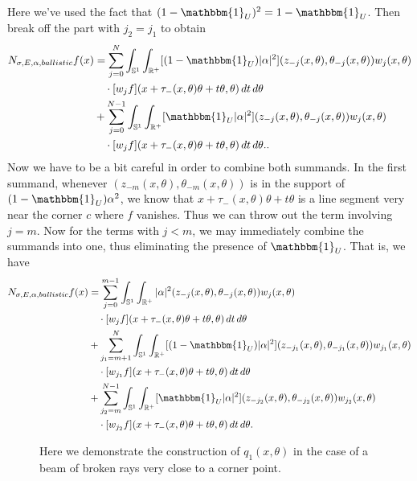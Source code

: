 \documentclass[10pt]{amsart}
\theoremstyle{definition}
\theoremstyle{definition}
\theoremstyle{definition}
\newcommand{ \rn }[1]{\mathbb{R}^{#1}}
\begin{document}
Here we've used the fact that $(1-\mathbbm{1}_{U})^{2} = 1 - \mathbbm{1}_{U}$. Then break off the part with $j_{2} = j_{1}$ to obtain
\begin{align*}
N_{\sigma, E, \alpha, ballistic}f(x) & =  \sum_{j=0}^{N}\int_{\mathbb{S}^{1}}\int_{\rn{+}}[(1-\mathbbm{1}_{U})|\alpha|^{2}](z_{-j}(x,\theta),\theta_{-j}(x,\theta))w_{j}(x,\theta) \notag\\
& \quad \cdot [w_{j}f](x + \tau_{-}(x,\theta)\theta+ t\theta, \theta)\, dt \,d\theta \notag\\
& +  \sum_{j=0}^{N-1}\int_{\mathbb{S}^{1}}\int_{\rn{+}}[\mathbbm{1}_{U}|\alpha|^{2}](z_{-j}(x,\theta),\theta_{-j}(x,\theta))w_{j}(x,\theta) \notag\\
& \quad \cdot [w_{j}f](x + \tau_{-}(x,\theta)\theta + t\theta, \theta)\, dt \,d\theta.\notag.
\end{align*}
Now we have to be a bit careful in order to combine both summands. In the first summand, whenever $(z_{-m}(x,\theta), \theta_{-m}(x,\theta))$ is in the support of $(1-\mathbbm{1}_{U})\alpha^{2}$, we know that $x+\tau_{-}(x,\theta)\theta + t\theta$ is a line segment very near the corner $c$ where $f$ vanishes. Thus we can throw out the term involving $j = m$. Now for the terms with $j < m$, we may immediately combine the summands into one, thus eliminating the presence of $\mathbbm{1}_{U}$. That is, we have
\begin{align}
N_{\sigma, E, \alpha, ballistic}f(x) & = \sum_{j=0}^{m-1}\int_{\mathbb{S}^{1}}\int_{\rn{+}}|\alpha|^{2}(z_{-j}(x,\theta),\theta_{-j}(x,\theta))w_{j}(x,\theta) \notag\\
& \quad \cdot [w_{j}f](x + \tau_{-}(x,\theta)\theta+ t\theta, \theta)\, dt \,d\theta \notag\\
& + \sum_{j_{1}=m+1}^{N}\int_{\mathbb{S}^{1}}\int_{\rn{+}}[(1-\mathbbm{1}_{U})|\alpha|^{2}](z_{-j_{1}}(x,\theta),\theta_{-j_{1}}(x,\theta))w_{j_{1}}(x,\theta) \notag\\
& \quad \cdot [w_{j_{1}}f](x + \tau_{-}(x,\theta)\theta+ t\theta, \theta)\, dt \,d\theta \notag\\
& + \sum_{j_{2}=m}^{N-1}\int_{\mathbb{S}^{1}}\int_{\rn{+}}[\mathbbm{1}_{U}|\alpha|^{2}](z_{-j_{2}}(x,\theta),\theta_{-j_{2}}(x,\theta))w_{j_{2}}(x,\theta) \notag\\
& \quad \cdot [w_{j_{2}}f](x + \tau_{-}(x,\theta)\theta + t\theta, \theta)\, dt \,d\theta. \label{eq:normalballistic2}
\end{align}

\begin{figure}
\centering
\def \svgwidth{0.7\columnwidth}

\caption{Here we demonstrate the construction of $q_{1}(x,\theta)$ in the case of a beam of broken rays very close to a corner point.\label{fig:qm}}
\end{figure}
\end{document}
